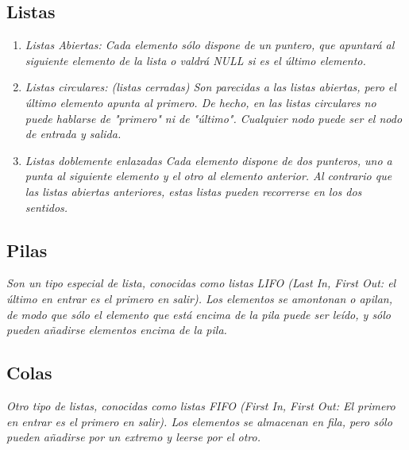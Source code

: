 \documentclass{article}
\begin{document}
\subsection{Listas} \label{sec:Listas}
\begin{enumerate}
 \item\textsl{Listas Abiertas: Cada elemento sólo dispone de un puntero, que apuntará al siguiente elemento de la lista o valdrá NULL si es el último elemento.}
\item \textsl{Listas circulares: (listas cerradas) Son parecidas a las listas abiertas, pero el último elemento apunta al primero. De hecho, en las listas circulares no puede hablarse de "primero" ni de "último". Cualquier nodo puede ser el nodo de entrada y salida.}
\item \textsl{Listas doblemente enlazadas Cada elemento dispone de dos punteros, uno a punta al siguiente elemento y el otro al elemento anterior. Al contrario que las listas abiertas anteriores, estas listas pueden recorrerse en los dos sentidos.}
\end{enumerate}
\subsection{Pilas}\label{sec:Pilas}
\textit{Son un tipo especial de lista, conocidas como listas LIFO (Last In, First Out: el último en entrar es el primero en salir). Los elementos se amontonan o apilan, de modo que sólo el elemento que está encima de la pila puede ser leído, y sólo pueden añadirse elementos encima de la pila.}
\subsection{Colas}\label{sec:Colas}
\textsl{Otro tipo de listas, conocidas como listas FIFO (First In, First Out: El primero en entrar es el primero en salir). Los elementos se almacenan en fila, pero sólo pueden añadirse por un extremo y leerse por el otro.}
\end{document}
